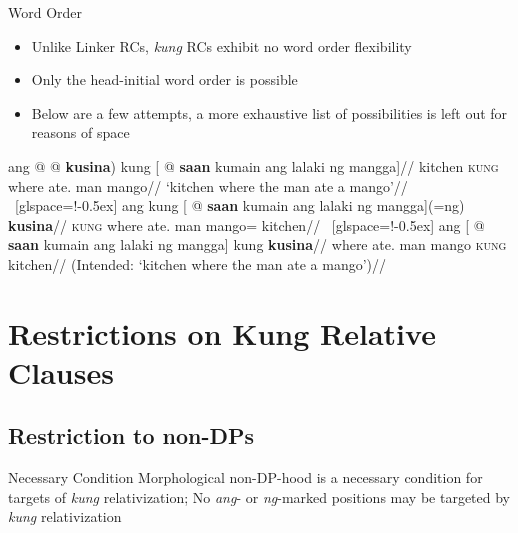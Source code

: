 \documentclass[pdf]{beamer}
\newcommand{\g}[1]{\textsc{#1}}
\newcommand{\texthl}[1]{\textcolor{cyan!75!blue}{\textbf{#1}}}
\begin{document}
\begin{frame}{Word Order}
  \begin{itemize}
    \item Unlike Linker RCs, \textit{kung} RCs exhibit no word order flexibility
    \item Only the head-initial word order is possible
    \item Below are a few attempts, a more exhaustive list of possibilities is left out for reasons of space
  \end{itemize}
  \ex[glspace=!-0.5ex]\begingl
    \gla  ang @ \nogloss{*(} @ \texthl{kusina}) kung [ @ \texthl{saan} kumain ang lalaki ng mangga]//
    \glb  \Nom{} kitchen \g{kung} where ate.\Av{} \Nom{} man \Gen{} mango//
    \glft `kitchen where the man ate a mango'//
  \endgl
  \xe
  \ex~[glspace=!-0.5ex]\ljudge{*}\begingl
    \gla  ang kung [ @ \texthl{saan} kumain ang lalaki ng mangga](=ng) \texthl{kusina}//
    \glb  \Nom{} \g{kung} where ate.\Av{} \Nom{} man \Gen{} mango=\Lk{} kitchen//
  \endgl
  \xe
  \ex~[glspace=!-0.5ex]\ljudge{*}\begingl
    \gla  ang [ @ \texthl{saan} kumain ang lalaki ng mangga] kung \texthl{kusina}//
    \glb  \Nom{} where ate.\Av{} \Nom{} man \Gen{} mango \g{kung} kitchen//
    \glft (Intended: `kitchen where the man ate a mango')//
  \endgl
  \xe

\end{frame}

\section[Kung RC Restrictions]{Restrictions on Kung Relative Clauses}
\subsection{Restriction to non-DPs}

\begin{frame}
  \begin{alertblock}{Necessary Condition}
    Morphological non-DP-hood is a necessary condition for targets of \textit{kung} relativization;
    No \textit{ang}- or \textit{ng}-marked positions may be targeted by \textit{kung} relativization
  \end{alertblock}
\end{frame}
\end{document}
